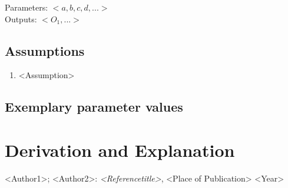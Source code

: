 \documentclass[10pt,a4paper]{article}
\begin{document}
	
	\noindent
	Parameters: $<a,b,c,d, ...>$ %
	\\
	Outputs: $<O_1,...>$ %
	
	
	\subsection{Assumptions} %
		\begin{enumerate} %
			\item <Assumption>
		\end{enumerate}
	
	
	\subsection{Exemplary parameter values}
	

	
	\section{Derivation and Explanation} %
	
	
	\begin{thebibliography}{10}		
		<Author1>; <Author2>: 
		\textit{<Referencetitle>}, <Place of Publication> <Year>
	\end{thebibliography}
\end{document}
